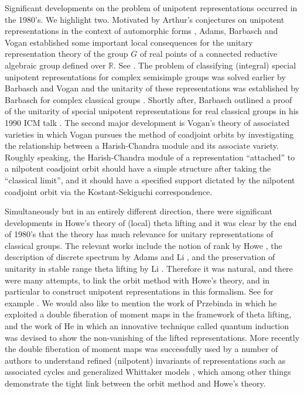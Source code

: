 \documentclass[12pt,a4paper]{amsart}
\newcommand{\R}{\mathbb R}
\numberwithin{equation}{section}
\theoremstyle{remark}
\begin{document}
Significant developments on the problem of unipotent representations occurred in
the 1980's. We highlight two. Motivated by Arthur's conjectures on unipotent
representations in the context of automorphic forms \cite{ArPro,ArUni}, Adams,
Barbasch and Vogan established some important local consequences for the unitary
representation theory of the group $G$ of real points of a connected reductive
algebraic group defined over $\R$. See \cite{ABV}. The problem of classifying
(integral) special unipotent representations for complex semisimple groups was
solved earlier by Barbasch and Vogan \cite{BVUni} and the unitarity of these representations
was established by Barbasch for complex classical groups \cite[Section 10]{B.Class}. Shortly after,
Barbasch outlined a proof of the unitarity of special unipotent
representations for real classical groups in his 1990 ICM talk \cite{B.Uni}. The
second major development is Vogan's theory of associated varieties \cite{Vo89}
in which Vogan pursues the method of coadjoint orbits by investigating the
relationship between a Harish-Chandra module and its associate variety. Roughly
speaking, the Harish-Chandra module of a representation ``attached'' to a nilpotent
coadjoint orbit should have a simple structure after taking the ``classical
limit'', and it should have a specified support dictated by the nilpotent
coadjoint orbit via the Kostant-Sekiguchi correspondence.

Simultaneously but in an entirely different direction, there were significant
developments in Howe's theory of (local) theta lifting \cite{Howe79} and it was clear by the
end of 1980's that the theory has much relevance for unitary representations of
classical groups. The relevant works include the notion of rank by Howe
\cite{HoweRank}, the description of discrete spectrum by Adams \cite{Ad83} and Li \cite{Li90},
and the preservation of unitarity in stable range theta lifting by Li \cite{Li89}.
Therefore it was natural, and there were many attempts, to link the orbit method
with Howe's theory, and in particular to construct unipotent representations in
this formalism. See for example \cite{Sa,HZ,HL,Br,He,Tr,PT,B17}. We would also like
to mention the work of Przebinda \cite{Pz1,Pz2} in which he exploited a double
fiberation of moment maps in the framework of theta lifting,
and the work of He \cite{He} in which an innovative technique called quantum
induction was devised to show the non-vanishing of the lifted representations.
More recently the double fiberation of moment maps was successfully used by a
number of authors to understand refined (nilpotent) invariants of
representations such as associated cycles and generalized Whittaker models
\cite{NOTYK, NZ, GZ, LM}, which among other things demonstrate the tight link
between the orbit method and Howe's theory.
\end{document}
